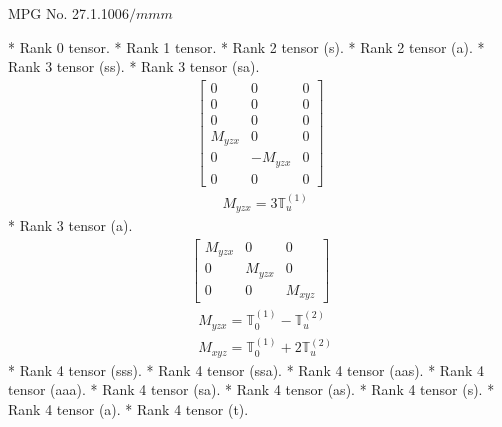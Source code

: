 \documentclass[fleqn,8pt,landscape]{jsarticle}
\begin{document}
\setcounter{MaxMatrixCols}{32}

\renewcommand{\tablename}{Table~}
\renewcommand{\figurename}{Figure~}
\begin{center}
\LARGE
MPG No. 27.1.100\quad$6/mmm$
\end{center}
* Rank 0 tensor.
* Rank 1 tensor.
* Rank 2 tensor (s).
* Rank 2 tensor (a).
* Rank 3 tensor (ss).
* Rank 3 tensor (sa).
\begin{align*}
\begin{bmatrix} 0 & 0 & 0 \\ 0 & 0 & 0 \\ 0 & 0 & 0 \\ M_{yzx} & 0 & 0 \\ 0 & - M_{yzx} & 0 \\ 0 & 0 & 0 \end{bmatrix}
\end{align*}
\begin{align*}
& M_{yzx} = 3 \mathbb{T}_{u}^{(1)}
\end{align*}
* Rank 3 tensor (a).
\begin{align*}
\begin{bmatrix} M_{yzx} & 0 & 0 \\ 0 & M_{yzx} & 0 \\ 0 & 0 & M_{xyz} \end{bmatrix}
\end{align*}
\begin{align*}
& M_{yzx} = \mathbb{T}_{0}^{(1)} - \mathbb{T}_{u}^{(2)} \\
& M_{xyz} = \mathbb{T}_{0}^{(1)} + 2 \mathbb{T}_{u}^{(2)}
\end{align*}
* Rank 4 tensor (sss).
* Rank 4 tensor (ssa).
* Rank 4 tensor (aas).
* Rank 4 tensor (aaa).
* Rank 4 tensor (sa).
* Rank 4 tensor (as).
* Rank 4 tensor (s).
* Rank 4 tensor (a).
* Rank 4 tensor (t).
\end{document}
